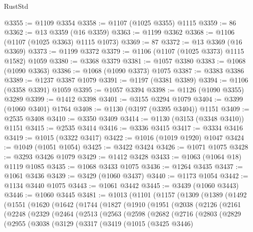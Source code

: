 \begin{lexlean}{RustStd}
\begin{coremodule}
@3355 := @1109 @3354
@3358 := @1107 (@1025 @3355) @1115
@3359 := 86
@3362 := @13 @3359 (@16 @3359)
@3363 := @1199 @3362
@3368 := @1106 (@1107 (@1025 @3363) @1115 @1073)
@3369 := 87
@3372 := @13 @3369 (@16 @3369)
@3373 := @1199 @3372
@3379 := @1106 (@1107 (@1025 @3373) @1115 @1582) @1059
@3380 := @3368 @3379
@3381 := @1057 @3380
@3383 := @1068 (@1090 @3363)
@3386 := @1068 (@1090 @3373) @1075
@3387 := @3383 @3386
@3389 := @1237 @3387 @1079
@3391 := @1197 (@3381 @3389)
@3394 := @1106 (@3358 @3391) @1059
@3395 := @1057 @3394
@3398 := @1126 (@1090 @3355) @3289
@3399 := @1412 @3398
@3401 := @3155 @3294 @1079
@3404 := @3399 (@1060 @3401) @1764
@3408 := @1130 (@3197 (@3395 @3404)) @1151
@3409 := @2535 @3408
@3410 := @3350 @3409
@3414 := @1130 (@3153 (@3348 @3410)) @1151
@3415 := @2535 @3414
@3416 := @3336 @3415
@3417 := @3334 @3416
@3419 := @1015 (@3322 @3417)
@3422 := @1016 (@1019 @1920) @1047
@3424 := @1049 (@1051 @1054)
@3425 := @3422 @3424
@3426 := @1071 @1075
@3428 := @3293 @3426 @1079
@3429 := @1412 @3428
@3433 := @1063 (@1064 @18) @1119 @1085
@3435 := @1068 @3433 @1075
@3436 := @1264 @3435
@3437 := @1061 @3436
@3439 := @3429 (@1060 @3437)
@3440 := @1173 @1054
@3442 := @1134 @3440 @1075
@3443 := @1061 @3442
@3445 := @3439 (@1060 @3443)
@3446 := @1060 @3445
@3481 := @1013
    (@1101
      (@1157
        (@1309
          (@1389
            (@1492
              (@1551
                (@1620
                  (@1642
                    (@1744
                      (@1827
                        (@1910
                          (@1951
                            (@2038
                              (@2126
                                (@2161
                                  (@2248
                                    (@2329
                                      (@2464
                                        (@2513
                                          (@2563
                                            (@2598
                                              (@2682
                                                (@2716
                                                  (@2803
                                                    (@2829
                                                      (@2955
                                                        (@3038
                                                          (@3129
                                                            (@3317
                                                              (@3419
                                                                (@1015
                                                                  (@3425 @3446)

\end{coremodule}
\end{lexlean}
